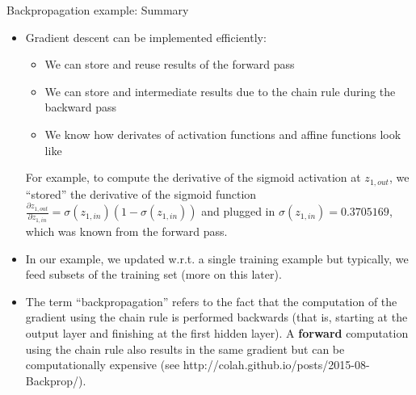 \begin{vbframe} {Backpropagation example: Summary}

  \begin{itemize}
    \item Gradient descent can be implemented efficiently: 
    \begin{itemize}
      \item We can store and reuse results of the forward pass
      \item We can store and intermediate results due to the chain rule during the backward pass  
      \item We know how derivates of activation functions and affine functions look like
    \end{itemize}
    For example, to compute the derivative of the sigmoid activation at $z_{1,out}$, we \enquote{stored} the derivative of the sigmoid function $\frac{\partial z_{1,out}}{\partial z_{1,in}} = \sigma(z_{1,in})(1-\sigma(z_{1,in}))$ and plugged in $\sigma(z_{1,in}) = \num[round-mode=places,round-precision=4]{0.3705169}$, which was known from the forward pass.

  \end{itemize}

  \framebreak  

  \begin{itemize}
  \item In our example, we updated w.r.t. a single training example but typically, we feed subsets of the training set (more on this later).
    \item The term \enquote{backpropagation} refers to the fact that the computation of the gradient using the chain rule is performed backwards (that is, starting at the output layer and finishing at the first hidden layer). 
      A \textbf{forward} computation using the chain rule also results in the same gradient but can be computationally expensive (see http://colah.github.io/posts/2015-08-Backprop/).
 \end{itemize}
\end{vbframe} 

